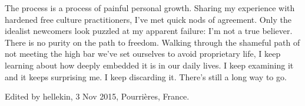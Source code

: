 The process is a process of painful personal growth. Sharing my
experience with hardened free culture practitioners, I've met quick nods
of agreement. Only the idealist newcomers look puzzled at my apparent
failure: I'm not a true believer. There is no purity on the path to
freedom. Walking through the shameful path of not meeting the high bar
we've set ourselves to avoid proprietary life, I keep learning about how
deeply embedded it is in our daily lives. I keep examining it and it
keeps surprising me. I keep discarding it. There's still a long way to
go.

Edited by hellekin, 3 Nov 2015, Pourrières, France.
